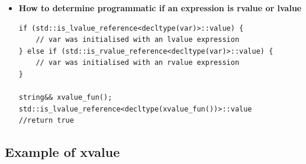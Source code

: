 \documentclass[a4paper,11pt,twoside]{book}
\begin{document}
\begin{itemize}
\item \textbf{How to determine programmatic if an expression is rvalue or lvalue}
\begin{lstlisting}[numbers=none]
if (std::is_lvalue_reference<decltype(var)>::value) {
	// var was initialised with an lvalue expression
} else if (std::is_rvalue_reference<decltype(var)>::value) {
	// var was initialised with an rvalue expression
}

string&& xvalue_fun();
std::is_lvalue_reference<decltype(xvalue_fun())>::value
//return true
\end{lstlisting}

\end{itemize}

\subsection{Example of xvalue}
\end{document}
